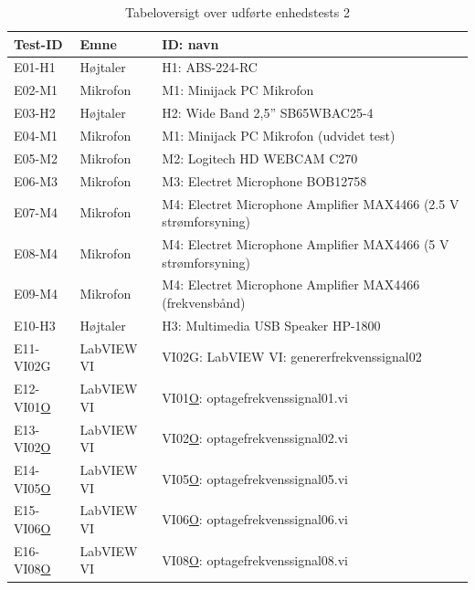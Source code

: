 	\begin{table}[htb]
				\centering
				\caption{Tabeloversigt over udførte enhedstests 2} 
				\label{enhedstests 2}
				\begin{tabular}{lll}
					\multicolumn{1}{l|}{\textbf{Test-ID}} & 	
					\multicolumn{1}{l|}{\textbf{Emne}} & \textbf{ID: navn} \\ \hline
					\multicolumn{1}{l|}{E01-H1}& 
					\multicolumn{1}{l|}{Højtaler}&H1: ABS-224-RC\\
					\multicolumn{1}{l|}{E02-M1}& 
					\multicolumn{1}{l|}{Mikrofon}&M1: Minijack PC Mikrofon\\
					\multicolumn{1}{l|}{E03-H2}& 
					\multicolumn{1}{l|}{Højtaler}&H2: Wide Band 2,5'' SB65WBAC25-4\\
					\multicolumn{1}{l|}{E04-M1}& 
					\multicolumn{1}{l|}{Mikrofon}&M1: Minijack PC Mikrofon (udvidet test)\\
					\multicolumn{1}{l|}{E05-M2}& 
					\multicolumn{1}{l|}{Mikrofon}&M2: Logitech HD WEBCAM C270\\	
					\multicolumn{1}{l|}{E06-M3}& 
					\multicolumn{1}{l|}{Mikrofon}&M3: Electret Microphone BOB12758\\
						\multicolumn{1}{l|}{E07-M4}& 
					\multicolumn{1}{l|}{Mikrofon}&M4: Electret Microphone Amplifier MAX4466 (2.5 V strømforsyning)\\
					\multicolumn{1}{l|}{E08-M4}& 
					\multicolumn{1}{l|}{Mikrofon}&M4: Electret Microphone Amplifier MAX4466 (5 V strømforsyning)\\
					\multicolumn{1}{l|}{E09-M4}& 
					\multicolumn{1}{l|}{Mikrofon}&M4: Electret Microphone Amplifier MAX4466 (frekvensbånd)\\
					\multicolumn{1}{l|}{E10-H3}& 
					\multicolumn{1}{l|}{Højtaler}&H3: Multimedia USB Speaker HP-1800\\
						
					\multicolumn{1}{l|}{E11-VI02G}& 
					\multicolumn{1}{l|}{LabVIEW VI}&VI02G: LabVIEW VI: genererfrekvenssignal02\\
					\multicolumn{1}{l|}{E12-VI01\underline{O}}& 
					\multicolumn{1}{l|}{LabVIEW VI}&VI01\underline{O}: optagefrekvenssignal01.vi\\
					\multicolumn{1}{l|}{E13-VI02\underline{O}}& 
					\multicolumn{1}{l|}{LabVIEW VI}&VI02\underline{O}: optagefrekvenssignal02.vi\\
					\multicolumn{1}{l|}{E14-VI05\underline{O}}& 
					\multicolumn{1}{l|}{LabVIEW VI}&VI05\underline{O}: optagefrekvenssignal05.vi\\
					\multicolumn{1}{l|}{E15-VI06\underline{O}}& 
					\multicolumn{1}{l|}{LabVIEW VI}&VI06\underline{O}: optagefrekvenssignal06.vi\\
					\multicolumn{1}{l|}{E16-VI08\underline{O}}& 
					\multicolumn{1}{l|}{LabVIEW VI}&VI08\underline{O}: optagefrekvenssignal08.vi\\
								
				\end{tabular}
			\end{table}
	
